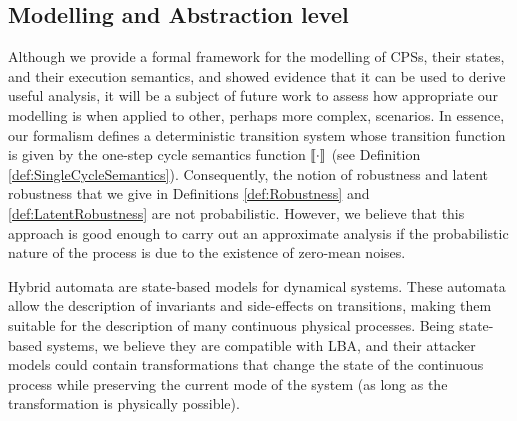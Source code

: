 {\subsection{Modelling and Abstraction level}
Although we provide a formal framework for the modelling of CPSs, their states, and their execution semantics, and showed evidence that it can be used to derive useful analysis, it will be a subject of future work to assess how appropriate our modelling is when applied to other, perhaps more complex, scenarios. In essence, our formalism defines a deterministic transition system whose transition function is given by the one-step cycle semantics function ${{{\llbracket\cdot\rrbracket}}}$ (see Definition \ref{def:SingleCycleSemantics}). Consequently, the notion of robustness and latent robustness that we give in Definitions \ref{def:Robustness} and \ref{def:LatentRobustness} are not probabilistic. However, we believe that this approach is good enough to carry out an approximate analysis if the probabilistic nature of the process is due to the existence of zero-mean noises. %

{Hybrid automata} \cite{ALUR19953} are state-based models for dynamical systems. These automata allow the description of invariants and side-effects on transitions, making them suitable for the description of many continuous physical processes. Being state-based systems, we believe they are compatible with LBA, and their attacker models could contain transformations that change the state of the continuous process while preserving the current mode of the system (as long as the transformation is physically possible). %


}
